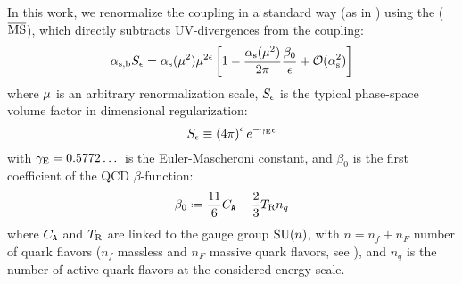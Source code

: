 In this work, we renormalize the coupling in a standard way (as in \cite{Catani-1998}) using the  ($ \overline{\text{MS}} $), which directly subtracts UV-divergences from the coupling:
\begin{equation}
  \alpha_\text{s,b} S_\epsilon = \alpha_\text{s}(\mu^2) \mu^{2\epsilon} \left[ 1 - \frac{\alpha_\text{s}(\mu^2)}{2\pi} \frac{\beta_0}{\epsilon} + \mathcal{O}(\alpha_\text{s}^2) \right]
  \label{eq:msb-def}
\end{equation}
where $ \mu $ is an arbitrary renormalization scale, $ S_\epsilon $ is the typical phase-space volume factor in dimensional regularization:
\begin{equation}
  S_\epsilon \equiv \left( 4\pi \right)^\epsilon e^{-\gamma_\text{E} \epsilon}
\end{equation}
with $ \gamma_\text{E} = 0.5772\dots $ is the Euler-Mascheroni constant, and $ \beta_0 $ is the first coefficient of the QCD $ \beta $-function:
\begin{equation}
  \beta_0 \defeq \frac{11}{6} \caa - \frac{2}{3} \ttr n_q
\end{equation}
where $ C_\mathtt{A} $ and $ T_\text{R} $ are linked to the gauge group $ \mathrm{SU}(n) $, with $ n = n_f + n_F $ number of quark flavors ($ n_f $ massless and $ n_F $ massive quark flavors, see ), and $ n_q $ is the number of active quark flavors at the considered energy scale.

